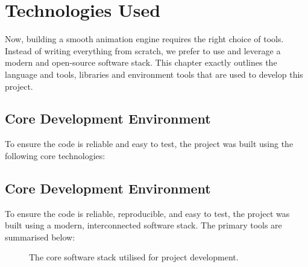 \documentclass[12pt, a4paper]{report}
\begin{document}
\chapter{Technologies Used}

Now, building a smooth animation engine requires the right choice of tools. Instead of writing everything from scratch, we prefer to use and leverage a modern and open-source software stack.
This chapter exactly outlines the language and tools, libraries and environment tools that are used to develop this project.

\section{Core Development Environment}
To ensure the code is reliable and easy to test, the project was built using the following core technologies:

\section{Core Development Environment}

To ensure the code is reliable, reproducible, and easy to test, the project was built using a modern, interconnected software stack. The primary tools are summarised below:

\vspace{0.6cm}
\begin{figure}[htbp]
    \centering
    \caption{The core software stack utilised for project development.}
    \label{fig:tech_stack}
\end{figure}
\vspace{0.4cm}
\end{document}

